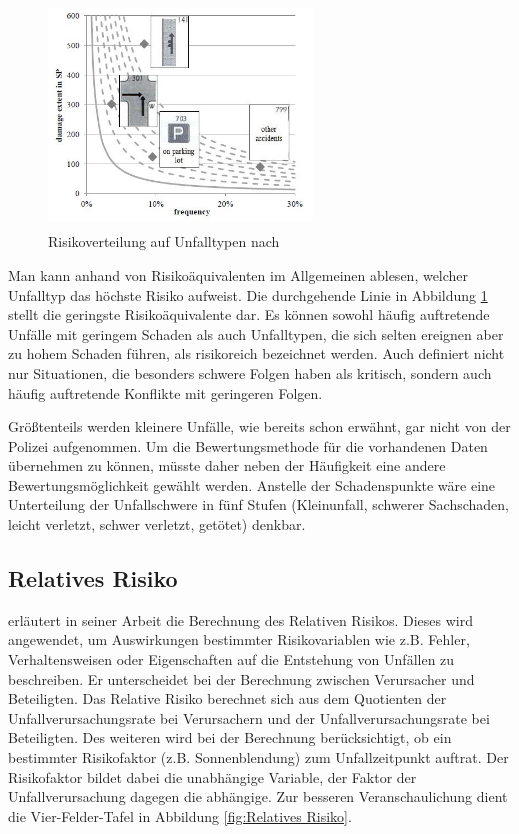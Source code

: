 \begin{savenotes}
	\begin{figure}[H]
		\centering
		\includegraphics[width=7cm,height=6cm]{figures/Risikoverteilung}
		\caption[Risikoverteilung auf Unfalltypen.]{Risikoverteilung auf Unfalltypen nach \parencite[S. 376]{Gschwendtner.2014}}\label{fig:Risikoverteilung}
	\end{figure}
\end{savenotes}


Man kann anhand von Risikoäquivalenten im Allgemeinen ablesen, welcher Unfalltyp das höchste Risiko aufweist. Die durchgehende Linie in Abbildung \ref{fig:Risikoverteilung} stellt die geringste Risikoäquivalente dar. Es können sowohl häufig auftretende Unfälle mit geringem Schaden als auch Unfalltypen, die sich selten ereignen aber zu hohem Schaden führen, als risikoreich bezeichnet werden. Auch \Textcite[S. 14]{Mages.2008} definiert nicht nur Situationen, die besonders schwere Folgen haben als kritisch, sondern auch häufig auftretende Konflikte mit geringeren Folgen.

Größtenteils werden kleinere Unfälle, wie bereits schon erwähnt, gar nicht von der Polizei aufgenommen. Um die Bewertungsmethode für die vorhandenen Daten übernehmen zu können, müsste daher neben der Häufigkeit eine andere Bewertungsmöglichkeit gewählt werden. Anstelle der Schadenspunkte wäre eine Unterteilung der Unfallschwere in fünf Stufen (Kleinunfall, schwerer Sachschaden, leicht verletzt, schwer verletzt, getötet) denkbar.

\subsection{Relatives Risiko}
\Textcite[S. 112f]{Grundl.2005} erläutert in seiner Arbeit die Berechnung des Relativen Risikos. Dieses wird angewendet, um Auswirkungen bestimmter Risikovariablen wie z.B. Fehler, Verhaltensweisen oder Eigenschaften auf die Entstehung von Unfällen zu beschreiben. Er unterscheidet bei der Berechnung zwischen Verursacher und Beteiligten. Das Relative Risiko berechnet sich aus dem Quotienten der Unfallverursachungsrate bei Verursachern und der Unfallverursachungsrate bei Beteiligten. %
Des weiteren wird bei der Berechnung berücksichtigt, ob ein bestimmter Risikofaktor (z.B. Sonnenblendung) zum Unfallzeitpunkt auftrat. Der Risikofaktor bildet dabei die unabhängige Variable, der Faktor der Unfallverursachung dagegen die abhängige. Zur besseren Veranschaulichung dient die Vier-Felder-Tafel in Abbildung \ref{fig:Relatives Risiko}. 

